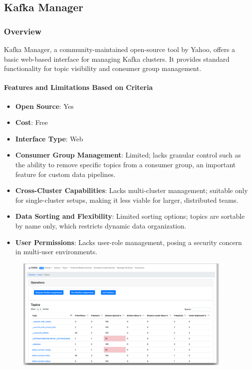 \documentclass[10pt , a4paper]{report}
\begin{document}
\newpage

\subsection{Kafka Manager} 
\subsubsection*{Overview} 
Kafka Manager, a community-maintained open-source tool by Yahoo, offers a basic web-based interface for managing Kafka clusters. It provides standard functionality for topic visibility and consumer group management.

\paragraph{Features and Limitations Based on Criteria}
\begin{itemize} 
    \item \small \textbf{Open Source}: Yes
    \item \small \textbf{Cost}: Free 
    \item \small \textbf{Interface Type}: Web 
    \item \small \textbf{Consumer Group Management}: Limited; lacks granular control such as the ability to remove specific topics from a consumer group, an important feature for custom data pipelines.
    \item \small \textbf{Cross-Cluster Capabilities}: Lacks multi-cluster management; suitable only for single-cluster setups, making it less viable for larger, distributed teams.
    \item \small \textbf{Data Sorting and Flexibility}: Limited sorting options; topics are sortable by name only, which restricts dynamic data organization.
    \item \small \textbf{User Permissions}: Lacks user-role management, posing a security concern in multi-user environments.
\end{itemize}

\begin{figure}[htbp]
  \begin{center}
    \includegraphics[width=0.95\textwidth]{imgs/KafkaManager.png}
  \end{center}
  \caption{}\label{fig:}
\end{figure}
\end{document}
